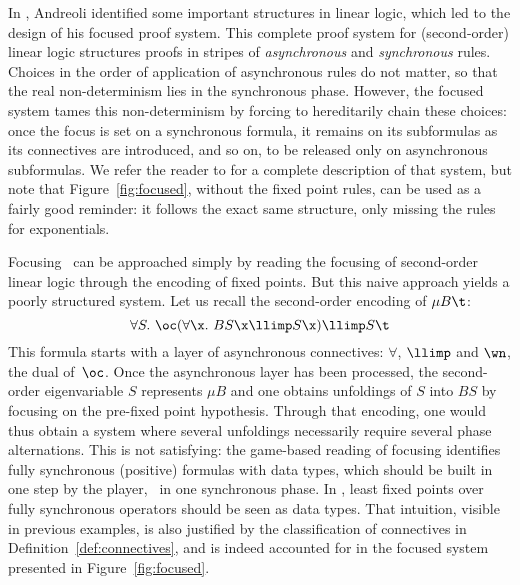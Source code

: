


\label{sec:foc_mumall}

In \cite{andreoli92jlc}, Andreoli identified some important structures
in linear logic, which led to the design of his focused proof system.
This complete proof system for (second-order) linear logic structures
proofs in stripes of \emph{asynchronous} and \emph{synchronous} rules.
Choices in the order of application of asynchronous rules do not matter,
so that the real non-determinism lies in the synchronous phase.
However, the focused system tames this non-determinism by forcing
to hereditarily chain these choices: once the focus is set on a
synchronous formula, it remains on its subformulas
as its connectives are introduced, and so on,
to be released only on asynchronous subformulas.
We refer the reader to \cite{andreoli92jlc} for a complete
description of that system,
but note that Figure~\ref{fig:focused}, without the fixed point rules,
can be used as a fairly good reminder:
it follows the exact same structure, only missing the rules for exponentials.

Focusing \mumall\ can be approached simply by reading the
focusing of second-order linear logic through the encoding of fixed points.
But this naive approach yields a poorly
structured system.
Let us recall the second-order encoding of $\mu B \t$:
\[ \forall S.~ \oc(\forall \x.~ B S \x \llimp S \x) \llimp S \t \]
This formula starts with a layer of asynchronous connectives:
$\forall$, $\llimp$ and ${\wn}$, the dual of $\,{\oc}$.
Once the asynchronous layer has been 
processed, the second-order eigenvariable $S$ represents $\mu B$
and one obtains unfoldings of $S$ into $BS$
by focusing on the pre-fixed point hypothesis.
Through that encoding, one would thus obtain a system where several unfoldings
necessarily require several phase alternations.
This is not satisfying:
the game-based reading of focusing identifies fully synchronous (positive)
formulas with data types, which should be built in one step by the player,
\ie\ in one synchronous phase.
In \mumall, least fixed points over fully synchronous operators
should be seen as data types.
That intuition, visible in previous examples, is also justified
by the classification of connectives in Definition~\ref{def:connectives},
and is indeed accounted for in the focused system
presented in Figure~\ref{fig:focused}.


